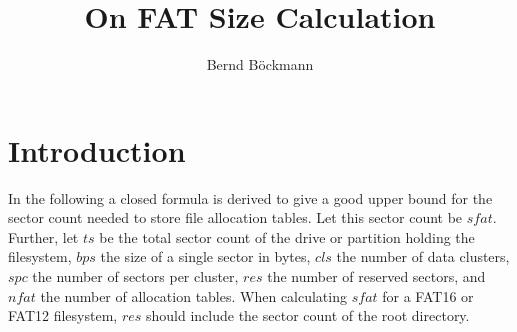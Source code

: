 \documentclass[12pt]{article}
\title{On FAT Size Calculation}
\author{Bernd Böckmann}
\begin{document}
\maketitle

\section{Introduction}
In the following a closed formula is derived to give a good upper bound for the sector count needed to store file allocation tables. Let this sector count be $sfat$. Further, let $ts$ be the total sector count of the drive or partition holding the filesystem, $bps$ the size of a single sector in bytes, $cls$ the number of data clusters, $spc$ the number of sectors per cluster, $res$ the number of reserved sectors, and $nfat$ the number of allocation tables. When calculating $sfat$ for a FAT16 or FAT12 filesystem, $res$ should include the sector count of the root directory.
\end{document}
